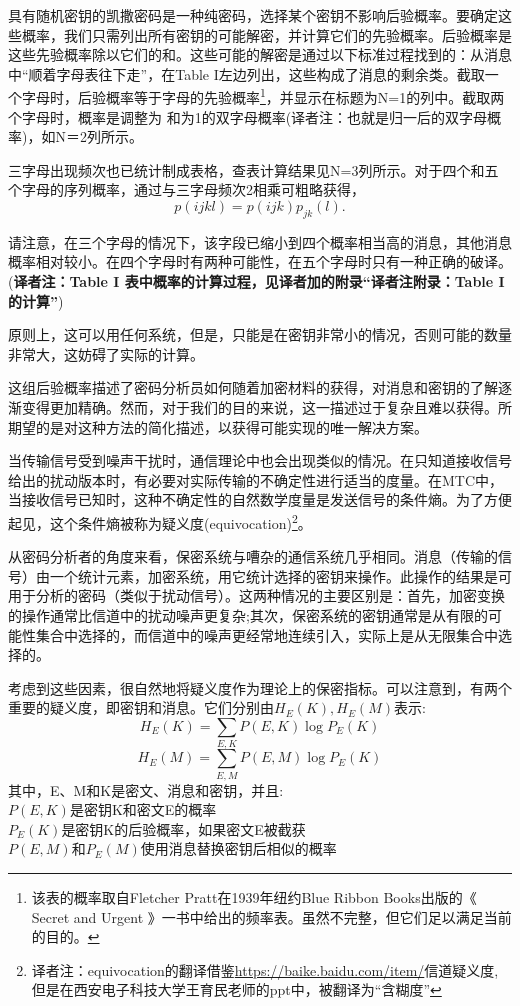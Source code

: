 \documentclass[]{article}
\begin{document}
具有随机密钥的凯撒密码是一种纯密码，选择某个密钥不影响后验概率。要确定这些概率，我们只需列出所有密钥的可能解密，并计算它们的先验概率。后验概率是这些先验概率除以它们的和。这些可能的解密是通过以下标准过程找到的：从消息中“顺着字母表往下走”，在Table I左边列出，这些构成了消息的剩余类。截取一个字母时，后验概率等于字母的先验概率\footnote{该表的概率取自Fletcher Pratt在1939年纽约Blue Ribbon Books出版的《 Secret and Urgent  》一书中给出的频率表。虽然不完整，但它们足以满足当前的目的。}，并显示在标题为N=1的列中。截取两个字母时，概率是调整为
和为1的双字母概率(译者注：也就是归一后的双字母概率)，如N＝2列所示。

三字母出现频次也已统计制成表格，查表计算结果见N=3列所示。对于四个和五个字母的序列概率，通过与三字母频次2相乘可粗略获得，
\[p(ijkl)=p(ijk)p_{jk}(l).\]

请注意，在三个字母的情况下，该字段已缩小到四个概率相当高的消息，其他消息概率相对较小。在四个字母时有两种可能性，在五个字母时只有一种正确的破译。(\textbf{译者注：Table I 表中概率的计算过程，见译者加的附录“译者注附录：Table I的计算”})

原则上，这可以用任何系统，但是，只能是在密钥非常小的情况，否则可能的数量非常大，这妨碍了实际的计算。

这组后验概率描述了密码分析员如何随着加密材料的获得，对消息和密钥的了解逐渐变得更加精确。然而，对于我们的目的来说，这一描述过于复杂且难以获得。所期望的是对这种方法的简化描述，以获得可能实现的唯一解决方案。

当传输信号受到噪声干扰时，通信理论中也会出现类似的情况。在只知道接收信号给出的扰动版本时，有必要对实际传输的不确定性进行适当的度量。在MTC中，当接收信号已知时，这种不确定性的自然数学度量是发送信号的条件熵。为了方便起见，这个条件熵被称为疑义度(equivocation)\footnote{译者注：equivocation的翻译借鉴\url{https://baike.baidu.com/item/}信道疑义度,但是在西安电子科技大学王育民老师的ppt中，被翻译为“含糊度”}。

从密码分析者的角度来看，保密系统与嘈杂的通信系统几乎相同。消息（传输的信号）由一个统计元素，加密系统，用它统计选择的密钥来操作。此操作的结果是可用于分析的密码（类似于扰动信号）。这两种情况的主要区别是：首先，加密变换的操作通常比信道中的扰动噪声更复杂;其次，保密系统的密钥通常是从有限的可能性集合中选择的，而信道中的噪声更经常地连续引入，实际上是从无限集合中选择的。

考虑到这些因素，很自然地将疑义度作为理论上的保密指标。可以注意到，有两个重要的疑义度，即密钥和消息。它们分别由$H_E(K),H_E(M)$表示:
\[H_E(K)=\sum_{E,K}{P(E,K)\log{P_E(K)}}\]
\[H_E(M)=\sum_{E,M}{P(E,M)\log{P_E(K)}}\]
其中，E、M和K是密文、消息和密钥，并且:\\
$P(E,K)$是密钥K和密文E的概率\\
$P_E(K)$是密钥K的后验概率，如果密文E被截获\\
$P(E,M)$和$P_E(M)$使用消息替换密钥后相似的概率\\
\end{document}
